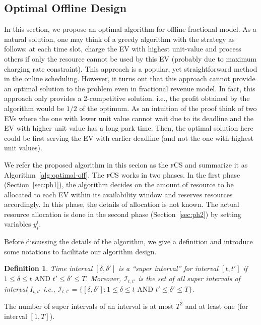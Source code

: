 \documentclass[journal]{IEEEtran}
\newcommand{\bt}[1]{{\color{blue}#1}}%
\newcommand{\revv}[1]{{\color{black}#1}}%
\newcommand{\bt}[1]{#1}
\newcommand{\fcs}{\textsc{fCS}\xspace}
\newtheorem{defi}{Definition}
\begin{document}
\revv{
\subsection{Optimal Offline Design}
\label{sec:fopt}	
\bt{
In this section, we propose an optimal algorithm for offline fractional model. As a natural solution, one may think of a greedy algorithm with the strategy as follows: at each time slot, charge the EV with highest unit-value and process others if only the resource cannot be used by this EV (probably due to maximum charging rate constraint). 
This approach is a popular, yet straightforward method in the online scheduling. However, it turns out that this approach cannot provide an optimal solution to the problem even in fractional revenue model. In fact, this approach only provides a 2-competitive solution. i.e., the profit obtained by the algorithm would be $1/2$ of the optimum. As an intuition of the proof think of two EVs where the one with lower unit value cannot wait due to its deadline and the EV with higher unit value has a long park time. Then, the optimal solution here could be first serving the EV with earlier deadline (and not the one with highest unit values).
}	
		
We refer the proposed algorithm in this secion as the \fcs and summarize it as Algorithm~\ref{alg:optimal-off}.
The \fcs works in two phases. In the first phase (Section~\ref{sec:ph1}), the algorithm decides on the amount of resource to be allocated to each EV within its availability window and reserves resources accordingly. In this phase, the details of allocation is not known. The actual resource allocation is done in the second phase (Section~\ref{sec:ph2}) by setting variables $y_i^t$.

Before discussing the details of the algorithm, we give \bt{a definition} and introduce some notations to facilitate our algorithm design.

\begin{defi}
	Time interval $[\delta,\delta']$ is a ``super interval'' for interval $[t,t']$ if $1\leq \delta\leq t \text{~AND~} t' \leq \delta'\leq T$.
	Moreover, $\mathcal{I}_{t,t'}$ is the set of all super intervals of interval $I_{t,t'}$ i.e., ${\mathcal{I}_{t,t'}=\{[\delta,\delta']: 1\leq \delta\leq t \text{~AND~} t'\leq \delta'\leq T\}}$.
\end{defi}

The number of super intervals of an interval is at most $T^2$ and at least one (for interval $[1,T]$). 

}
\end{document}
